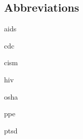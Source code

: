 \documentclass[../../EMT-169.tex]{subfiles}
\begin{document}
\subsection*{Abbreviations}
\begin{description}[leftmargin=!,labelwidth=\widthof{\bfseries ABCDE}]
	\item [\acrshort{aids}] 	\acrlong{aids}
	\item [\acrshort{cdc}] 		\acrlong{cdc}
	\item [\acrshort{cism}] 	\acrlong{cism}
	\item [\acrshort{hiv}] 		\acrlong{hiv}
	\item [\acrshort{osha}] 	\acrlong{osha}
	\item [\acrshort{ppe}] 		\acrlong{ppe}
	\item [\acrshort{ptsd}] 	\acrlong{ptsd}
\end{description}
\end{document}
